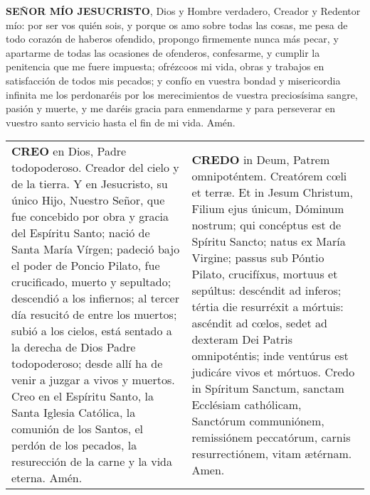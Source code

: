 \documentclass[./rosary.tex]{subfiles}
\begin{document}
\label{contrition}
\textbf{SEÑOR MÍO JESUCRISTO}, Dios y Hombre verdadero, Creador y Redentor mío: por ser vos quién sois, y porque os amo sobre todas las cosas,
me pesa de todo corazón de haberos ofendido, propongo firmemente nunca más pecar, y apartarme de todas las ocasiones de ofenderos,
confesarme, y cumplir la penitencia que me fuere impuesta; ofrézcoos mi vida, obras y trabajos en satisfacción de todos mis pecados;
y confío en vuestra bondad y misericordia infinita me los perdonaréis por los merecimientos de vuestra preciosísima sangre, pasión y muerte,
y me daréis gracia para enmendarme y para perseverar en vuestro santo servicio hasta el fin de mi vida. Amén.

\label{creed}
\begin{longtable} { p{} p{} }
    \textbf{CREO} en Dios, Padre todopoderoso. Creador del cielo y de la tierra. Y en Jesucristo, su único Hijo, Nuestro Señor,
    que fue concebido por obra y gracia del Espíritu Santo; nació de Santa María Vírgen; padeció bajo el poder de Poncio Pilato,
    fue crucificado, muerto y sepultado; descendió a los infiernos; al tercer día resucitó de entre los muertos; subió a los cielos,
    está sentado a la derecha de Dios Padre todopoderoso; desde allí ha de venir a juzgar a vivos y muertos.
    Creo en el Espíritu Santo, la Santa Iglesia Católica, la comunión de los Santos, el perdón de los pecados,
    la resurección de la carne y la vida eterna. Amén.
     &
    \textbf{CREDO} in Deum, Patrem omnipoténtem. Creatórem cœli et terræ. Et in Jesum Christum, Filium ejus únicum, Dóminum nostrum;
    qui concéptus est de Spíritu Sancto; natus ex María Virgine; passus sub Póntio Pilato, crucifíxus, mortuus et sepúltus:
    descéndit ad inferos; tértia die resurréxit a mórtuis: ascéndit ad cœlos, sedet ad dexteram Dei Patris omnipoténtis;
    inde ventúrus est judicáre vivos et mórtuos. Credo in Spíritum Sanctum, sanctam Ecclésiam cathólicam, Sanctórum communiónem,
    remissiónem peccatórum, carnis resurrectiónem, vitam ætérnam. Amen.
\end{longtable}
\end{document}
